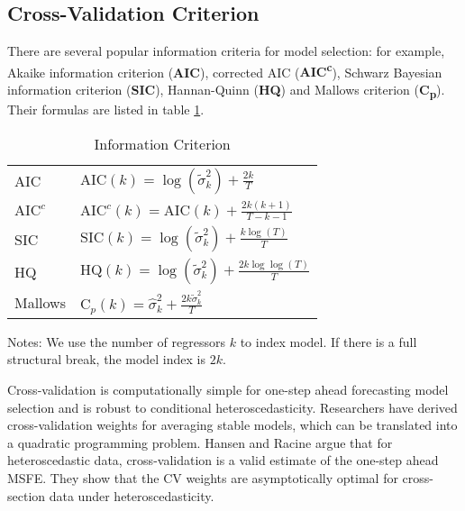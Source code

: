 \subsection{Cross-Validation Criterion}
There are several popular information criteria for model selection: for example, Akaike information criterion (\textbf{AIC}), corrected AIC (\textbf{AIC\textsuperscript{c}}), Schwarz Bayesian information criterion (\textbf{SIC}), Hannan-Quinn (\textbf{HQ}) and Mallows criterion (\textbf{C\textsubscript{p}}). Their formulas are listed in table \ref{tb:1}.
\begin{table}
\centering
\caption{Information Criterion} \label{tb:1}
\begin{threeparttable}
\begin{tabular}{ll}
\toprule
AIC                 & $\mathrm{AIC}(k) = \log{(\tilde{\sigma}^{2}_{k})} + \frac{2k}{T}$ \\[0.4em]
$\mathrm{AIC}^{c}$  & $\mathrm{AIC}^{c}(k) = \mathrm{AIC}(k) + \frac{2k(k+1)}{T-k-1}$ \\[0.4em]
SIC                 & $\mathrm{SIC}(k) = \log{(\tilde{\sigma}^{2}_{k})} + \frac{k\log{(T)}}{T}$ \\[0.4em]
HQ                  & $\mathrm{HQ}(k) = \log{(\tilde{\sigma}^{2}_{k})} + \frac{2k\log{\log(T)}}{T}$ \\[0.4em]
Mallows            & $\mathrm{C}_{p}(k) = \hat{\sigma}^{2}_{k} + \frac{2k\tilde{\sigma}^{2}_{k}}{T}$\\
\bottomrule
\end{tabular}
\begin{tablenotes} \footnotesize
Notes: We use the number of regressors $k$ to index model. If there is a full structural break, the model index is $2k$.
\end{tablenotes}
\end{threeparttable}
\end{table}

Cross-validation is computationally simple for one-step ahead forecasting model selection and is robust to conditional heteroscedasticity. Researchers have derived cross-validation weights for averaging stable models, which can be translated into a quadratic programming problem. Hansen and Racine \cite{hansen2011jackknife} argue that for heteroscedastic data, cross-validation is a valid estimate of the one-step ahead MSFE. They show that the CV weights are asymptotically optimal for cross-section data under heteroscedasticity.

